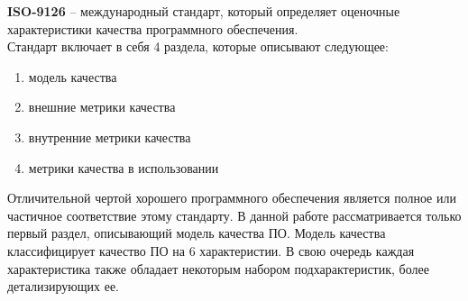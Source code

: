 \documentclass[a4paper,14pt]{extreport} %
\begin{document}
\textbf{ISO-9126} -- международный стандарт, который определяет оценочные характеристики качества программного обеспечения\cite{ISO-9126}. \\
Стандарт включает в себя 4 раздела, которые описывают следующее:
\begin{enumerate}
\item модель качества
\item внешние метрики качества
\item внутренние метрики качества
\item метрики качества в использовании
\end{enumerate} 
Отличительной чертой хорошего программного обеспечения является полное или частичное соответствие этому стандарту.
В данной работе рассматривается только первый раздел, описывающий модель качества ПО. Модель качества классифицирует качество ПО на 6 характеристии. В свою очередь каждая характеристика также обладает некоторым набором подхарактеристик, более детализирующих ее.
\end{document}
